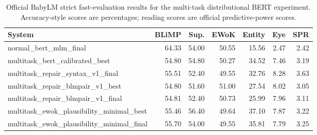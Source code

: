 \begin{table}[t]
\centering
\small
\begin{tabular}{lrrrrrr}
\toprule
\textbf{System} & \textbf{BLiMP} & \textbf{Sup.} & \textbf{EWoK} & \textbf{Entity} & \textbf{Eye} & \textbf{SPR} \\
\midrule
normal_bert_mlm_final & 64.33 & 54.00 & 50.55 & 15.56 & 2.47 & 2.42 \\
multitask_bert_calibrated_best & 54.80 & 54.80 & 50.27 & 34.52 & 7.46 & 3.19 \\
multitask_repair_syntax_v1_final & 55.51 & 52.40 & 49.55 & 32.76 & 8.28 & 3.63 \\
multitask_repair_blmpair_v1_best & 54.80 & 51.60 & 51.00 & 27.54 & 8.02 & 3.05 \\
multitask_repair_blmpair_v1_final & 54.81 & 52.40 & 50.73 & 25.99 & 7.96 & 3.11 \\
multitask_ewok_plausibility_minimal_best & 55.46 & 56.40 & 49.64 & 37.10 & 7.87 & 3.22 \\
multitask_ewok_plausibility_minimal_final & 55.70 & 54.00 & 49.55 & 35.81 & 7.79 & 3.25 \\
\bottomrule
\end{tabular}
\caption{Official BabyLM strict fast-evaluation results for the multi-task distributional BERT experiment. Accuracy-style scores are percentages; reading scores are official predictive-power scores.}
\label{tab:multitask-distributional-fast-eval}
\end{table}
